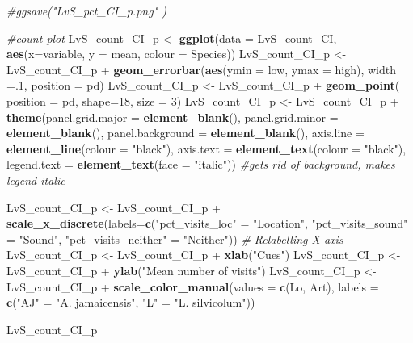 \documentclass[]{article}
\newenvironment{Shaded}{\begin{snugshade}}{\end{snugshade}}
\newcommand{\KeywordTok}[1]{\textcolor[rgb]{0.13,0.29,0.53}{\textbf{{#1}}}}
\newcommand{\DataTypeTok}[1]{\textcolor[rgb]{0.13,0.29,0.53}{{#1}}}
\newcommand{\DecValTok}[1]{\textcolor[rgb]{0.00,0.00,0.81}{{#1}}}
\newcommand{\StringTok}[1]{\textcolor[rgb]{0.31,0.60,0.02}{{#1}}}
\newcommand{\CommentTok}[1]{\textcolor[rgb]{0.56,0.35,0.01}{\textit{{#1}}}}
\newcommand{\NormalTok}[1]{{#1}}
\begin{document}
\begin{Shaded}
\begin{Highlighting}[]
\CommentTok{#ggsave("LvS_pct_CI_p.png" )}

\CommentTok{#count plot}
\NormalTok{LvS_count_CI_p <-}\StringTok{ }\KeywordTok{ggplot}\NormalTok{(}\DataTypeTok{data =} \NormalTok{LvS_count_CI, }\KeywordTok{aes}\NormalTok{(}\DataTypeTok{x=}\NormalTok{variable, }\DataTypeTok{y =} \NormalTok{mean, }\DataTypeTok{colour =} \NormalTok{Species))}
\NormalTok{LvS_count_CI_p <-}\StringTok{ }\NormalTok{LvS_count_CI_p +}\StringTok{ }\KeywordTok{geom_errorbar}\NormalTok{(}\KeywordTok{aes}\NormalTok{(}\DataTypeTok{ymin =} \NormalTok{low, }\DataTypeTok{ymax =} \NormalTok{high), }\DataTypeTok{width =}\NormalTok{.}\DecValTok{1}\NormalTok{, }\DataTypeTok{position =} \NormalTok{pd)}
\NormalTok{LvS_count_CI_p <-}\StringTok{ }\NormalTok{LvS_count_CI_p +}\StringTok{ }\KeywordTok{geom_point}\NormalTok{( }\DataTypeTok{position =} \NormalTok{pd, }\DataTypeTok{shape=}\DecValTok{18}\NormalTok{, }\DataTypeTok{size =} \DecValTok{3}\NormalTok{)}
\NormalTok{LvS_count_CI_p <-}\StringTok{ }\NormalTok{LvS_count_CI_p +}\StringTok{ }\KeywordTok{theme}\NormalTok{(}\DataTypeTok{panel.grid.major =} \KeywordTok{element_blank}\NormalTok{(), }\DataTypeTok{panel.grid.minor =} \KeywordTok{element_blank}\NormalTok{(),}
\DataTypeTok{panel.background =} \KeywordTok{element_blank}\NormalTok{(), }\DataTypeTok{axis.line =} \KeywordTok{element_line}\NormalTok{(}\DataTypeTok{colour =} \StringTok{"black"}\NormalTok{), }\DataTypeTok{axis.text =} \KeywordTok{element_text}\NormalTok{(}\DataTypeTok{colour =} \StringTok{"black"}\NormalTok{), }\DataTypeTok{legend.text =} \KeywordTok{element_text}\NormalTok{(}\DataTypeTok{face =} \StringTok{"italic"}\NormalTok{))  }\CommentTok{#gets rid of background, makes legend italic}

\NormalTok{LvS_count_CI_p <-}\StringTok{ }\NormalTok{LvS_count_CI_p +}\StringTok{ }\KeywordTok{scale_x_discrete}\NormalTok{(}\DataTypeTok{labels=}\KeywordTok{c}\NormalTok{(}\StringTok{"pct_visits_loc"} \NormalTok{=}\StringTok{ "Location"}\NormalTok{, }\StringTok{"pct_visits_sound"} \NormalTok{=}\StringTok{ "Sound"}\NormalTok{,}
                              \StringTok{"pct_visits_neither"} \NormalTok{=}\StringTok{ "Neither"}\NormalTok{))  }\CommentTok{# Relabelling X axis}
\NormalTok{LvS_count_CI_p <-}\StringTok{ }\NormalTok{LvS_count_CI_p +}\StringTok{ }\KeywordTok{xlab}\NormalTok{(}\StringTok{"Cues"}\NormalTok{)}
\NormalTok{LvS_count_CI_p <-}\StringTok{ }\NormalTok{LvS_count_CI_p +}\StringTok{ }\KeywordTok{ylab}\NormalTok{(}\StringTok{"Mean number of visits"}\NormalTok{)}
\NormalTok{LvS_count_CI_p <-}\StringTok{ }\NormalTok{LvS_count_CI_p +}\StringTok{ }\KeywordTok{scale_color_manual}\NormalTok{(}\DataTypeTok{values =} \KeywordTok{c}\NormalTok{(Lo, Art), }\DataTypeTok{labels =} \KeywordTok{c}\NormalTok{(}\StringTok{"AJ"} \NormalTok{=}\StringTok{ "A. jamaicensis"}\NormalTok{, }\StringTok{"L"} \NormalTok{=}\StringTok{ "L. silvicolum"}\NormalTok{))}

\NormalTok{LvS_count_CI_p }
\end{Highlighting}
\end{Shaded}
\end{document}
